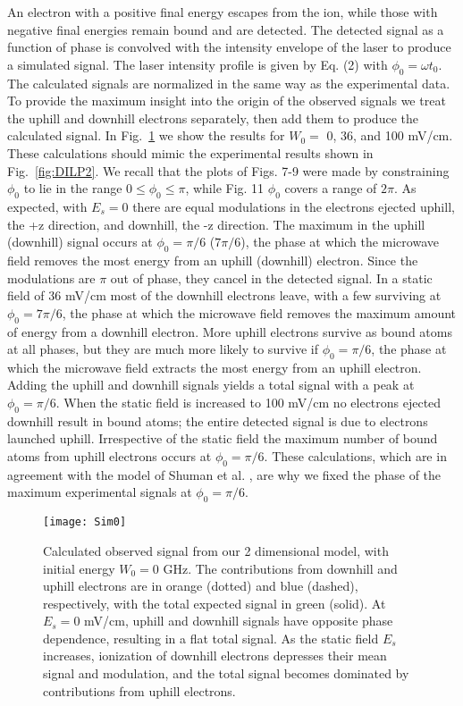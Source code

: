 \documentclass[aps,pra,preprint,groupedaddress]{revtex4-1}
\begin{document}
An electron with a positive final energy escapes from the ion, while those with negative final energies remain bound and are detected. The detected signal as a function of phase is convolved with the intensity envelope of the laser to produce a simulated signal. The laser intensity profile is given by Eq. (2) with $\phi_0=\omega t_0$. The calculated signals are normalized in the same way as the experimental data. To provide the maximum insight into the origin of the observed signals we treat the uphill and downhill electrons separately, then add them to produce the calculated signal.
In Fig.~\ref{fig:2DW0} we show the results for $W_0 =$ 0, 36, and 100 mV/cm. These calculations should mimic the experimental results shown in Fig.~\ref{fig:DILP2}. We recall that the plots of Figs. 7-9 were made by constraining $\phi_0$ to lie in the range $0\leq\phi_0\leq\pi$, while Fig. 11 $\phi_0$ covers a range of $2\pi$. As expected, with $E_s=0$ there are equal modulations in the electrons ejected uphill, the +z direction, and downhill, the -z direction. The maximum in the uphill (downhill) signal occurs at $\phi_0=\pi/6$ ($7\pi/6$), the phase at which the microwave field removes the most energy from an uphill (downhill) electron. Since the modulations are $\pi$ out of phase, they cancel in the detected signal. In a static field of 36 mV/cm most of the downhill electrons leave, with a few surviving at $\phi_0=7\pi/6$, the phase at which the microwave field removes the maximum amount of energy from a downhill electron. More uphill electrons survive as bound atoms at all phases, but they are much more likely to survive if $\phi_0=\pi/6$, the phase at which the microwave field extracts the most energy from an uphill electron. Adding the uphill and downhill signals yields a total signal with a peak at $\phi_0=\pi/6$. When the static field is increased to 100 mV/cm no electrons ejected downhill result in bound atoms; the entire detected signal is due to electrons launched uphill. Irrespective of the static field the maximum number of bound atoms from uphill electrons occurs at $\phi_0=\pi/6$. These calculations, which are in agreement with the model of Shuman et al. \cite{Shuman}, are why we fixed the phase of the maximum experimental signals at $\phi_0=\pi/6$.


\begin{figure}
	\texttt{[image: Sim0]}
	\caption{Calculated observed signal from our 2 dimensional model, with initial energy $W_0 = 0$ GHz. The contributions from downhill and uphill electrons are in orange (dotted) and blue (dashed), respectively, with the total expected signal in green (solid). At $E_s = 0$ mV/cm, uphill and downhill signals have opposite phase dependence, resulting in a flat total signal. As the static field $E_s$ increases, ionization of downhill electrons depresses their mean signal and modulation, and the total signal becomes dominated by contributions from uphill electrons.}
	\label{fig:2DW0}
\end{figure}
\end{document}
